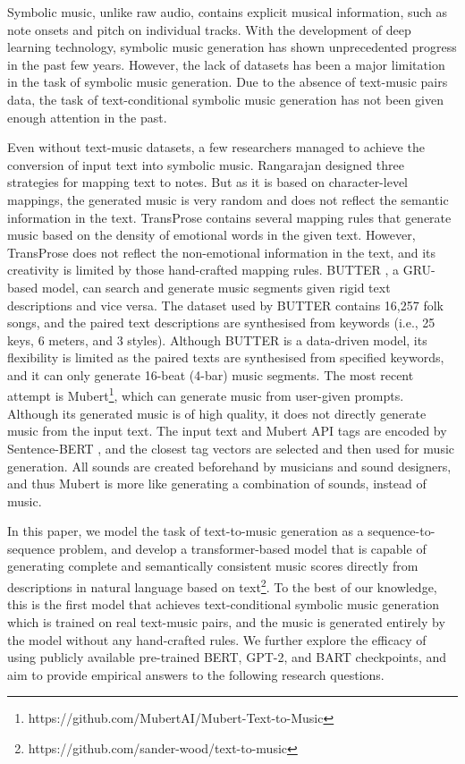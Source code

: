 \documentclass[letterpaper]{article} %
\begin{document}
Symbolic music, unlike raw audio, contains explicit musical information, such as note onsets and pitch on individual tracks. With the development of deep learning technology, symbolic music generation \cite{DBLP:journals/nca/Briot21} has shown unprecedented progress in the past few years. However, the lack of datasets has been a major limitation in the task of symbolic music generation. Due to the absence of text-music pairs data, the task of text-conditional symbolic music generation has not been given enough attention in the past.

Even without text-music datasets, a few researchers managed to achieve the conversion of input text into symbolic music. Rangarajan designed three strategies \cite{DBLP:conf/icdim/Rangarajan15} for mapping text to notes. But as it is based on character-level mappings, the generated music is very random and does not reflect the semantic information in the text. TransProse \cite{DBLP:conf/clfl/DavisM14} contains several mapping rules that generate music based on the density of emotional words \cite{DBLP:journals/ci/MohammadT13} in the given text. However, TransProse does not reflect the non-emotional information in the text, and its creativity is limited by those hand-crafted mapping rules. BUTTER \cite{zhang2020butter}, a GRU-based model, can search and generate music segments given rigid text descriptions and vice versa. The dataset used by BUTTER contains 16,257 folk songs, and the paired text descriptions are synthesised from keywords (i.e., 25 keys, 6 meters, and 3 styles). Although BUTTER is a data-driven model, its flexibility is limited as the paired texts are synthesised from specified keywords, and it can only generate 16-beat (4-bar) music segments. The most recent attempt is Mubert\footnote{https://github.com/MubertAI/Mubert-Text-to-Music}, which can generate music from user-given prompts. Although its generated music is of high quality, it does not directly generate music from the input text. The input text and Mubert API tags are encoded by Sentence-BERT \cite{DBLP:conf/emnlp/ReimersG19}, and the closest tag vectors are selected and then used for music generation. All sounds are created beforehand by musicians and sound designers, and thus Mubert is more like generating a combination of sounds, instead of music.

In this paper, we model the task of text-to-music generation as a sequence-to-sequence problem, and develop a transformer-based model that is capable of generating complete and semantically consistent music scores directly from descriptions in natural language based on text\footnote{https://github.com/sander-wood/text-to-music}. To the best of our knowledge, this is the first model that achieves text-conditional symbolic music generation which is trained on real text-music pairs, and the music is generated entirely by the model without any hand-crafted rules. We further explore the efficacy of using publicly available pre-trained BERT, GPT-2, and BART checkpoints, and aim to provide empirical answers to the following research questions.
\end{document}
